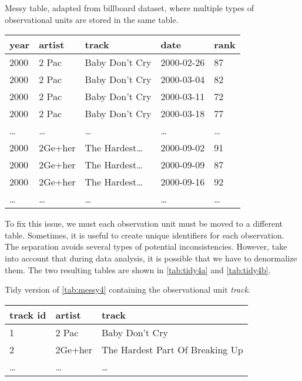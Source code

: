 \begin{tablebox}[label=tab:messy4]{Messy table, adapted from billboard dataset, where multiple types of observational units are stored in the same table.}
  \centering
  \begin{tabular}{lllll}
    \toprule
    \textbf{year} & \textbf{artist} & \textbf{track} & \textbf{date} & \textbf{rank} \\
    \midrule
    2000 & 2 Pac & Baby Don't Cry & 2000-02-26 & 87 \\
    2000 & 2 Pac & Baby Don't Cry & 2000-03-04 & 82 \\
    2000 & 2 Pac & Baby Don't Cry & 2000-03-11 & 72 \\
    2000 & 2 Pac & Baby Don't Cry & 2000-03-18 & 77 \\
    \dots & \dots & \dots & \dots & \dots \\
    2000 & 2Ge+her & The Hardest\dots & 2000-09-02 & 91 \\
    2000 & 2Ge+her & The Hardest\dots & 2000-09-09 & 87 \\
    2000 & 2Ge+her & The Hardest\dots & 2000-09-16 & 92 \\
    \dots & \dots & \dots & \dots & \dots \\
    \bottomrule
  \end{tabular}
\end{tablebox}

To fix this issue, we must each observation unit must be moved to a different table.
Sometimes, it is useful to create unique identifiers for each observation.
The separation avoids several types of potential inconsistencies.  However, take into
account that during data analysis, it is possible that we have to denormalize them.  The
two resulting tables are shown in \cref{tab:tidy4a} and \cref{tab:tidy4b}.

\begin{tablebox}[label=tab:tidy4a]{Tidy version of \cref{tab:messy4} containing the observational unit \emph{track}.}
  \centering
  \begin{tabular}{lll}
    \toprule
    \textbf{track id} & \textbf{artist} & \textbf{track} \\
    \midrule
    1 & 2 Pac & Baby Don't Cry \\
    2 & 2Ge+her & The Hardest Part Of Breaking Up \\
    \dots & \dots & \dots \\
    \bottomrule
  \end{tabular}
\end{tablebox}

